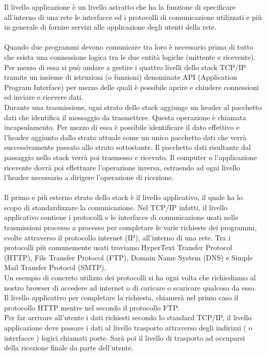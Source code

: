 \documentclass{report}%
\theoremstyle{plain}
\begin{document}
Il livello applicazione è un livello astratto che ha la funzione di specificare all'interno di una rete le interfacce ed i protocolli di comunicazione utilizzati e più in generale di fornire servizi alle applicazione degli utenti della rete.\\\\
Quando due programmi devono comunicare tra loro è necessario prima di tutto che esista una connessione logica tra le due entità logiche (mittente e ricevente). Per mezzo di essa si può andare a gestire i quattro livelli dello stack TCP/IP tramite un insieme di istruzioni (o funzioni) denominate API (Application Program Interface) per mezzo delle quali è possibile aprire e chiudere connessioni ed inviare e ricevere dati. \\Durante una trasmissione, ogni strato dello stack aggiunge un header al pacchetto dati che identifica il messaggio da trasmettere. Questa operazione è chiamata incapsulamento. Per mezzo di essa è possibile identificare il dato effettivo e l'header aggiunto dallo strato attuale come un unico pacchetto dati che verrà successivamente passato allo strato sottostante. Il pacchetto dati risultante dal passaggio nello stack verrà poi trasmesso e ricevuto. Il computer o l'applicazione ricevente dovrà poi effettuare  l'operazione inversa, estraendo ad ogni livello l'header necessario a dirigere l'operazione di ricezione.
\\\\Il primo e più esterno strato dello stack è il livello applicativo, il quale ha lo scopo di standardizzare la comunicazione. Nel TCP/IP infatti, il livello applicativo contiene i protocolli e le interfacce di comunicazione usati nelle trasmissioni processo a processo per completare le varie richieste dei programmi, svolte attraverso il protocollo internet (IP), all'interno di una rete. Tra i protocolli più comunemente usati troviamo HyperText Transfer Protocol (HTTP), File Transfer Protocol (FTP), Domain Name System (DNS) e Simple Mail Transfer Protocol (SMTP).\\
Un esempio di concreto utilizzo dei protocolli si ha ogni volta che richiediamo al nostro browser di accedere ad internet o di caricare o scaricare qualcosa da esso. Il livello applicativo per completare la richiesta, chiamerà nel primo caso il protocollo HTTP mentre nel secondo il protocollo FTP.\\
Per far arrivare all'utente i dati richiesti secondo lo standard TCP/IP, il livello applicazione deve passare i dati al livello trasporto attraverso degli indirizzi ( o interfacce ) logici chiamati porte. Sarà poi il livello di trasporto ad occuparsi della ricezione finale da parte dell'utente.\\
\end{document}
